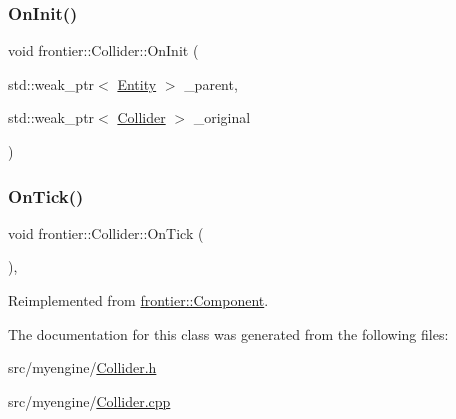 \subsubsection{\texorpdfstring{On\+Init()}{OnInit()}\hspace{0.1cm}{\footnotesize\ttfamily [2/2]}}
{\footnotesize\ttfamily void frontier\+::\+Collider\+::\+On\+Init (\begin{DoxyParamCaption}\item[{std\+::weak\+\_\+ptr$<$ \hyperlink{classfrontier_1_1_entity}{Entity} $>$}]{\+\_\+parent,  }\item[{std\+::weak\+\_\+ptr$<$ \hyperlink{classfrontier_1_1_collider}{Collider} $>$}]{\+\_\+original }\end{DoxyParamCaption})}

\mbox{\label{classfrontier_1_1_collider_ac03782c94e8f7a2064ea1441cbd12c81}} 
\subsubsection{\texorpdfstring{On\+Tick()}{OnTick()}}
{\footnotesize\ttfamily void frontier\+::\+Collider\+::\+On\+Tick (\begin{DoxyParamCaption}{ }\end{DoxyParamCaption})\hspace{0.3cm}{\ttfamily [override]}, {\ttfamily [virtual]}}



Reimplemented from \hyperlink{classfrontier_1_1_component_ab920f9bc07ce051ebb5559c5a66508d1}{frontier\+::\+Component}.



The documentation for this class was generated from the following files\+:\begin{DoxyCompactItemize}
\item 
src/myengine/\hyperlink{_collider_8h}{Collider.\+h}\item 
src/myengine/\hyperlink{_collider_8cpp}{Collider.\+cpp}\end{DoxyCompactItemize}
